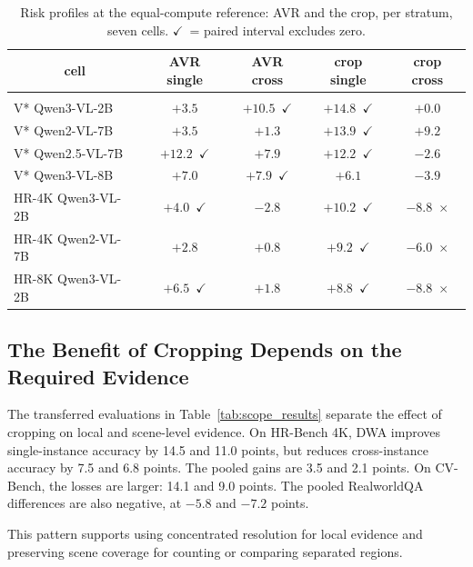 \documentclass{article} %
\newcommand{\bad}[1]{\textcolor{bad}{#1}}
\newcommand{\gd}[1]{\textcolor{gd}{#1}}
\newcommand{\ok}{\gd{$\checkmark$}}
\newcommand{\no}{\bad{$\times$}}
\begin{document}
\begin{table}[t]
\caption{Risk profiles at the equal-compute reference: AVR and the crop, per stratum, seven cells. \ok\ = paired interval excludes zero.}
\label{tab:risk}
\begin{center}
\small
\begin{tabular}{lcccc}
\multicolumn{1}{c}{\bf cell} &\multicolumn{1}{c}{\bf AVR single} &\multicolumn{1}{c}{\bf AVR cross} &\multicolumn{1}{c}{\bf crop single} &\multicolumn{1}{c}{\bf crop cross}
\\ \hline \\
V* Qwen3-VL-2B & $+3.5$ & \gd{$+10.5$}~\ok & \gd{$+14.8$}~\ok & $+0.0$\\
V* Qwen2-VL-7B & $+3.5$ & $+1.3$ & \gd{$+13.9$}~\ok & $+9.2$\\
V* Qwen2.5-VL-7B & \gd{$+12.2$}~\ok & $+7.9$ & \gd{$+12.2$}~\ok & $-2.6$\\
V* Qwen3-VL-8B & $+7.0$ & \gd{$+7.9$}~\ok & $+6.1$ & $-3.9$\\
HR-4K Qwen3-VL-2B & \gd{$+4.0$}~\ok & $-2.8$ & \gd{$+10.2$}~\ok & \bad{$-8.8$}~\no\\
HR-4K Qwen2-VL-7B & $+2.8$ & $+0.8$ & \gd{$+9.2$}~\ok & \bad{$-6.0$}~\no\\
HR-8K Qwen3-VL-2B & \gd{$+6.5$}~\ok & $+1.8$ & \gd{$+8.8$}~\ok & \bad{$-8.8$}~\no\\
\end{tabular}
\end{center}
\end{table}

\subsection{The Benefit of Cropping Depends on the Required Evidence}
\label{sec:scope_results}

The transferred evaluations in Table~\ref{tab:scope_results} separate
the effect of cropping on local and scene-level evidence. On HR-Bench 4K, DWA improves
single-instance accuracy by 14.5 and 11.0 points, but reduces
cross-instance accuracy by 7.5 and 6.8 points. The pooled gains are
3.5 and 2.1 points. On CV-Bench, the losses are larger: 14.1 and
9.0 points. The pooled RealworldQA differences are also negative,
at $-5.8$ and $-7.2$ points.

This pattern supports using concentrated resolution for local evidence
and preserving scene coverage for counting or comparing separated
regions.
\end{document}

